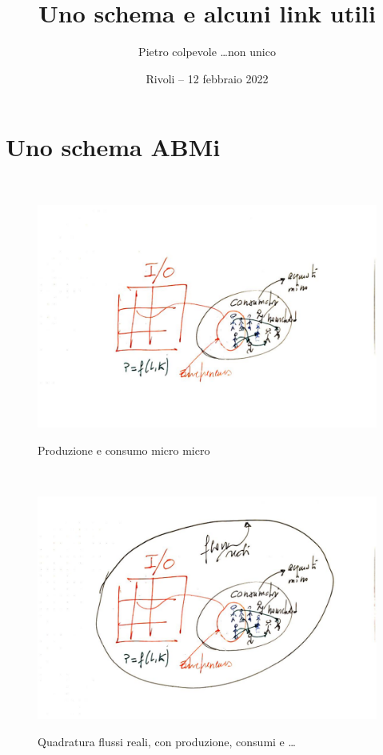 \documentclass[]{beamer}
\title{Uno schema e alcuni link utili}
\author[] %
{Pietro colpevole \ldots non unico}
\date[] %
{Rivoli -- 12 febbraio 2022}
\begin{document}
\begin{frame}


\titlepage


\end{frame}

\section{Uno schema ABMi}

\begin{frame}{~} %



\begin{figure}[H]
\center
\includegraphics[scale=0.50]{1.pdf}
\label{1}
\caption{Produzione e consumo micro micro}
\end{figure}

\end{frame}

\begin{frame}{~} %



\begin{figure}[H]
\center
\includegraphics[scale=0.50]{2.pdf}
\label{2}
\caption{Quadratura flussi reali, con produzione, consumi e \ldots}
\end{figure}

\end{frame}
\end{document}

